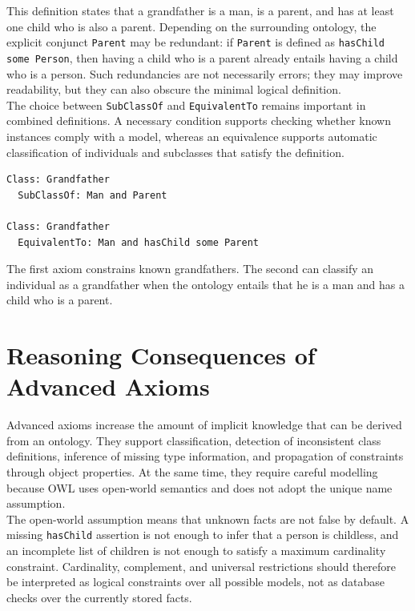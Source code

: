 \documentclass{scrbook}
\begin{document}
	This definition states that a grandfather is a man, is a parent, and has at least one child who is also a parent. Depending on the surrounding ontology, the explicit conjunct \texttt{Parent} may be redundant: if \texttt{Parent} is defined as \texttt{hasChild some Person}, then having a child who is a parent already entails having a child who is a person. Such redundancies are not necessarily errors; they may improve readability, but they can also obscure the minimal logical definition.\\
	
	The choice between \texttt{SubClassOf} and \texttt{EquivalentTo} remains important in combined definitions. A necessary condition supports checking whether known instances comply with a model, whereas an equivalence supports automatic classification of individuals and subclasses that satisfy the definition.
	
	\begin{lstlisting}
Class: Grandfather
  SubClassOf: Man and Parent

Class: Grandfather
  EquivalentTo: Man and hasChild some Parent
	\end{lstlisting}
	
	The first axiom constrains known grandfathers. The second can classify an individual as a grandfather when the ontology entails that he is a man and has a child who is a parent.
	
	\section{Reasoning Consequences of Advanced Axioms}
	
	Advanced axioms increase the amount of implicit knowledge that can be derived from an ontology. They support classification, detection of inconsistent class definitions, inference of missing type information, and propagation of constraints through object properties. At the same time, they require careful modelling because OWL uses open-world semantics and does not adopt the unique name assumption.\\
	
	The open-world assumption means that unknown facts are not false by default. A missing \texttt{hasChild} assertion is not enough to infer that a person is childless, and an incomplete list of children is not enough to satisfy a maximum cardinality constraint. Cardinality, complement, and universal restrictions should therefore be interpreted as logical constraints over all possible models, not as database checks over the currently stored facts.\\
	
\end{document}
